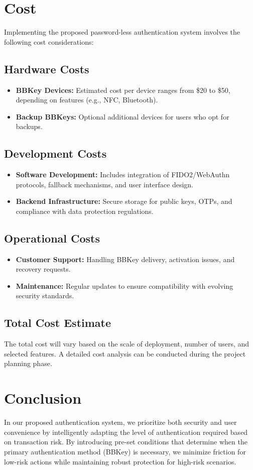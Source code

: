 \documentclass[12pt]{article}
\begin{document}
\section*{Cost}
Implementing the proposed password-less authentication system involves the following cost considerations:

\subsection*{Hardware Costs}
\begin{itemize}
    \item \textbf{BBKey Devices:} Estimated cost per device ranges from \$20 to \$50, depending on features (e.g., NFC, Bluetooth).
    \item \textbf{Backup BBKeys:} Optional additional devices for users who opt for backups.
\end{itemize}

\subsection*{Development Costs}
\begin{itemize}
    \item \textbf{Software Development:} Includes integration of FIDO2/WebAuthn protocols, fallback mechanisms, and user interface design.
    \item \textbf{Backend Infrastructure:} Secure storage for public keys, OTPs, and compliance with data protection regulations.
\end{itemize}

\subsection*{Operational Costs}
\begin{itemize}
    \item \textbf{Customer Support:} Handling BBKey delivery, activation issues, and recovery requests.
    \item \textbf{Maintenance:} Regular updates to ensure compatibility with evolving security standards.
\end{itemize}

\subsection*{Total Cost Estimate}
The total cost will vary based on the scale of deployment, number of users, and selected features. A detailed cost analysis can be conducted during the project planning phase.

\section*{Conclusion}
In our proposed authentication system, we prioritize both security and user convenience by intelligently adapting the level of authentication required based on transaction risk. By introducing pre-set conditions that determine when the primary authentication method (BBKey) is necessary, we minimize friction for low-risk actions while maintaining robust protection for high-risk scenarios.
\end{document}
